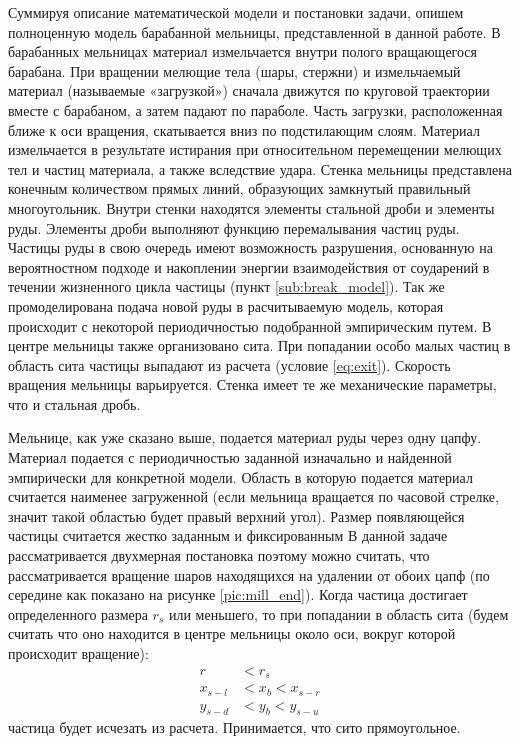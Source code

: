 \documentclass[utf8x, 14pt, oneside, a4paper]{article}
\begin{document}
Суммируя описание математической модели и постановки задачи, опишем полноценную модель барабанной мельницы, представленной в данной работе.
В барабанных мельницах материал измельчается внутри полого вращающегося барабана. 
При вращении мелющие тела (шары, стержни) и измельчаемый материал (называемые «загрузкой») сначала движутся по круговой траектории вместе с барабаном, а затем падают по параболе. Часть загрузки, расположенная ближе к оси вращения, скатывается вниз по подстилающим слоям. 
Материал измельчается в результате истирания при относительном перемещении мелющих тел и частиц материала, а также вследствие удара.
Стенка мельницы представлена конечным количеством прямых линий, образующих замкнутый правильный многоугольник.
Внутри стенки находятся элементы стальной дроби и элементы руды.
Элементы дроби выполняют функцию перемалывания частиц руды.
Частицы руды в свою очередь имеют возможность разрушения, основанную на вероятностном подходе и накоплении энергии взаимодействия от соударений в течении жизненного цикла частицы (пункт \ref{sub:break_model}).
Так же промоделирована подача новой руды в расчитываемую модель, которая происходит с некоторой периодичностью подобранной эмпирическим путем.
В центре мельницы также организовано сита.
При попадании особо малых частиц в область сита частицы выпадают из расчета (условие \ref{eq:exit}).
Скорость вращения мельницы варьируется.
Стенка имеет те же механические параметры, что и стальная дробь.

Мельнице, как уже сказано выше, подается материал руды через одну цапфу.
Материал подается с периодичностью заданной изначально и найденной эмпирически для конкретной модели.
Область в которую подается материал считается наименее загруженной (если мельница вращается по часовой стрелке, значит такой областью будет правый верхний угол).
Размер появляющейся частицы считается жестко заданным и фиксированным
В данной задаче рассматривается двухмерная постановка поэтому можно считать, что рассматривается вращение шаров находящихся на удалении от обоих цапф (по середине как показано на рисунке \ref{pic:mill_end}).
Когда частица достигает определенного размера $r_{s}$ или меньшего, то при попадании в область сита (будем считать что оно находится в центре мельницы около оси, вокруг которой происходит вращение):
\begin{align}
\label{eq:exit}
r &< r_s \\
x_{s-l} &< x_b < x_{s-r} \\
y_{s-d} &< y_b < y_{s-u}
\end{align}
частица будет исчезать из расчета. Принимается, что сито прямоугольное.
\end{document}
